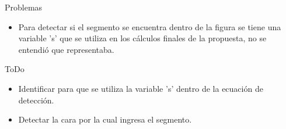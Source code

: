 \documentclass{beamer}
\begin{document}
\begin{frame}{Problemas}
  \begin{itemize}
   \item Para detectar si el segmento se encuentra dentro de la figura se tiene una variable 's' que se utiliza en los cálculos finales de la propuesta, no se entendió que representaba.
  \end{itemize}
\end{frame}

\begin{frame}{ToDo}
  \begin{itemize}
   \item Identificar para que se utiliza la variable 's' dentro de la ecuación de detección.
   \item Detectar la cara por la cual ingresa el segmento.
  \end{itemize}
\end{frame}


\medskip


\end{document}
